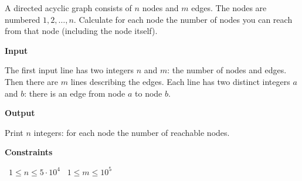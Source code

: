 A directed acyclic graph consists of $n$ nodes and $m$ edges. The nodes are numbered $1,2,\dots,n$.
Calculate for each node the number of nodes you can reach from that node (including the node itself).

\vspace{0.3cm}\noindent\textbf{Input}

The first input line has two integers $n$ and $m$: the number of nodes and edges.
Then there are $m$ lines describing the edges. Each line has two distinct integers $a$ and $b$: there is an edge from node $a$ to node $b$.

\vspace{0.3cm}\noindent\textbf{Output}

Print $n$ integers: for each node the number of reachable nodes.

\vspace{0.3cm}\noindent\textbf{Constraints}

\textbullet\ $1 \le n \le 5 \cdot 10^4$
\textbullet\ $1 \le m \le 10^5$